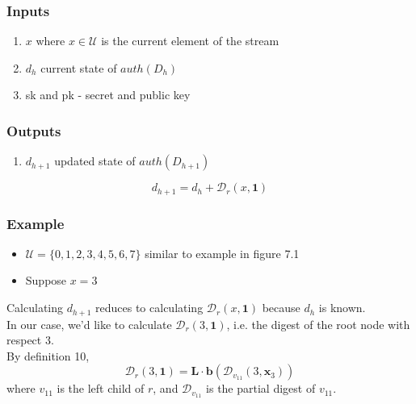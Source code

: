 \documentclass[11pt, letterpaper, oneside]{article}
\begin{document}
\subsubsection{Inputs}
\begin{enumerate}
\item $x$ where $x \in \mathcal{U}$ is the current element of the stream
\item $d_{h}$ current state of $auth(D_{h})$
\item sk and pk - secret and public key \\
\end{enumerate}

\subsubsection{Outputs}
\begin{enumerate}
\item $d_{h + 1}$ updated state of $auth(D_{h + 1})$
\end{enumerate}

\begin{equation}
d_{h+1} = d_{h} + \mathcal{D}_{r}(x, \textbf{1})
\end{equation}

\subsubsection{Example}

\begin{itemize}
\item $\mathcal{U} = \{ 0, 1, 2, 3, 4, 5, 6, 7\}$ similar to example in figure 7.1
\item Suppose $x = 3$
\end{itemize}

Calculating $d_{h + 1}$ reduces to calculating 	$ \mathcal{D}_{r}(x, \textbf{1})$ because $d_{h}$ is known.  \\

In our case, we'd like to calculate $\mathcal{D}_{r}(3, \textbf{1})$, i.e. the digest of the root node with respect 3. \\

By definition 10, 
\begin{equation}
\mathcal{D}_{r}(3, \textbf{1}) = \textbf{L} \cdot \textbf{b}(\mathcal{D}_{v_{11}}(3, \textbf{x}_{3})) 
\end{equation}
where $v_{11}$ is the left child of $r$, and $\mathcal{D}_{v_{11}}$ is the partial digest of $v_{11}$.
\end{document}
